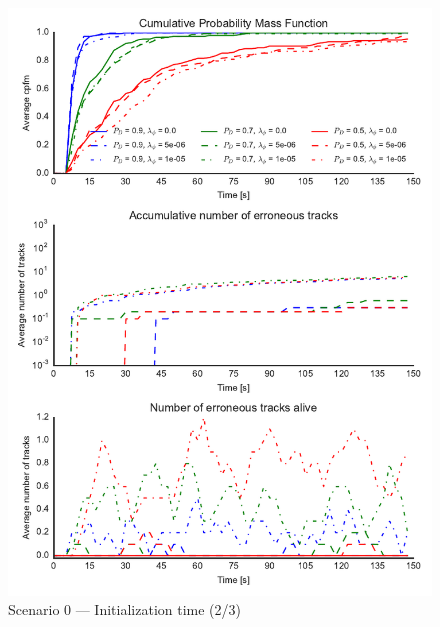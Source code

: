 \begin{figure}
\centering
\includegraphics{Figures/plots/Scenario0_Init-Time(2-3).pdf}
\caption{Scenario 0 --- Initialization time (2/3)}\label{fig:init0_time_2-3}
\end{figure}

